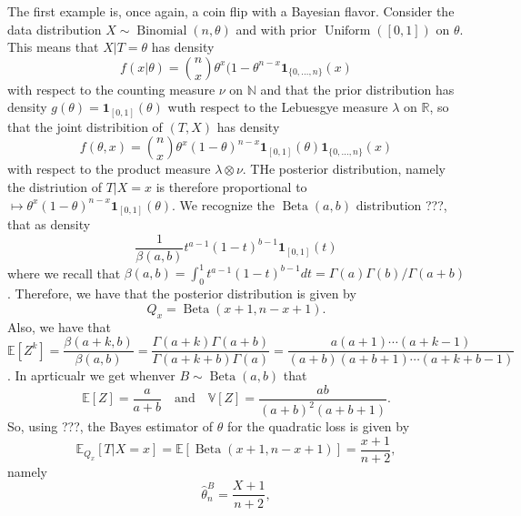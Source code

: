 \documentclass[
	fontsize=11pt, %
	twoside=false, %
	numbers=noenddot, %
]{kaobook}
\DeclareMathOperator{\bet}{Beta}
\DeclareMathOperator{\bin}{Binomial}
\DeclareMathOperator{\uni}{Uniform}
\newcommand{\E}{\mathbb E}
\newcommand{\R}{\mathbb R}
\newcommand{\N}{\mathbb N}
\newcommand{\var}{\mathbb V}
\newcommand{\wh}{\widehat}
\newcommand{\ind}[1]{\mathbf 1_{#1}}
\begin{document}
The first example is, once again, a coin flip with a Bayesian flavor.
Consider the data distribution $X \sim \bin(n, \theta)$ and with prior $\uni([0, 1])$ on $\theta$. This means that $X | T = \theta$ has density
\begin{equation*}
	f(x | \theta) = \binom{n}{x} \theta^x (1 - \theta^{n-x} \ind{\{ 0, \ldots, n\}}(x)	
\end{equation*}
with respect to the counting measure $\nu$ on $\N$ and that the prior distribution has density $g(\theta) = \ind{[0, 1]}(\theta)$ wuth respect to the Lebuesgye measure $\lambda$ on $\R$, so that the joint distribition of $(T, X)$ has density
\begin{equation*}
	f(\theta, x) = \binom{n}{x} \theta^x (1 - \theta)^{n - x} \ind{[0, 1]}(\theta) 
	\ind{\{ 0, \ldots, n\}}(x)
\end{equation*}
with respect to the product measure $\lambda \otimes \nu$. THe posterior distribution, namely the distriution of $T | X=x$ is therefore proportional to $\mapsto \theta^x (1 - \theta)^{n - x} \ind{[0, 1]}(\theta)$. We recognize the $\bet(a, b)$ distribution ???, that as density
\begin{equation*}
	\frac{1}{\beta(a, b)} t^{a-1} (1 - t)^{b-1} \ind{[0, 1]}(t)
\end{equation*}
where we recall that $\beta(a, b) = \int_0^1 t^{a-1} (1 - t)^{b-1} d t = \Gamma(a) \Gamma(b)  / \Gamma(a + b)$.
Therefore, we have that the posterior distribution is given by
\begin{equation*}
	Q_x = \bet(x + 1, n - x + 1).
\end{equation*}
Also, we have that
\begin{equation*}
	\E[Z^k] = \frac{\beta(a + k, b)}{\beta(a, b)} = \frac{\Gamma(a + k) \Gamma(a + b)}{\Gamma(a + k + b) \Gamma(a)} = \frac{a (a + 1) \cdots (a + k -1)}{(a + b) (a + b + 1) \cdots (a + k + b - 1)}
\end{equation*}
. In aprticualr we get whenver $B \sim \bet(a, b)$ that
\begin{equation*}
	\E[Z] = \frac{a}{a + b} \quad \text{and} \quad \var[Z] = \frac{ab}{(a + b)^2 (a + b + 1)}.
\end{equation*}
So, using ???, the Bayes estimator of $\theta$ for the quadratic loss is given by 
\begin{equation*}
	\E_{Q_x}[T | X=x] = \E[ \bet(x+1, n - x + 1)] = \frac{x + 1}{n + 2},
\end{equation*}
namely
\begin{equation*}
	\wh \theta_n^B = \frac{X + 1}{n + 2},
\end{equation*}
\end{document}
